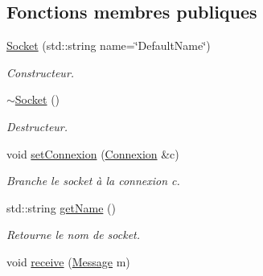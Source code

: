 \subsection*{Fonctions membres publiques}
\begin{DoxyCompactItemize}
\item 
\hypertarget{classSocket_a04302e4ac7ddb995c766de9078cd848c}{\hyperlink{classSocket_a04302e4ac7ddb995c766de9078cd848c}{Socket} (std\-::string name=\char`\"{}Default\-Name\char`\"{})}\label{classSocket_a04302e4ac7ddb995c766de9078cd848c}

\begin{DoxyCompactList}\small\item\em Constructeur. \end{DoxyCompactList}\item 
\hypertarget{classSocket_aeac4eb6379a543d38ed88977d3b6630a}{\hyperlink{classSocket_aeac4eb6379a543d38ed88977d3b6630a}{$\sim$\-Socket} ()}\label{classSocket_aeac4eb6379a543d38ed88977d3b6630a}

\begin{DoxyCompactList}\small\item\em Destructeur. \end{DoxyCompactList}\item 
\hypertarget{classSocket_a96d104e32d5f376796fb411874954e7d}{void \hyperlink{classSocket_a96d104e32d5f376796fb411874954e7d}{set\-Connexion} (\hyperlink{classConnexion}{Connexion} \&c)}\label{classSocket_a96d104e32d5f376796fb411874954e7d}

\begin{DoxyCompactList}\small\item\em Branche le socket à la connexion c. \end{DoxyCompactList}\item 
\hypertarget{classSocket_aaefa10006cbf7a7a082e4adc606b3cea}{std\-::string \hyperlink{classSocket_aaefa10006cbf7a7a082e4adc606b3cea}{get\-Name} ()}\label{classSocket_aaefa10006cbf7a7a082e4adc606b3cea}

\begin{DoxyCompactList}\small\item\em Retourne le nom de socket. \end{DoxyCompactList}\item 
\hypertarget{classSocket_af137eda5415e1bd9aa6dd6467eb0d97d}{void \hyperlink{classSocket_af137eda5415e1bd9aa6dd6467eb0d97d}{receive} (\hyperlink{classMessage}{Message} m)}\label{classSocket_af137eda5415e1bd9aa6dd6467eb0d97d}


\end{DoxyCompactItemize}
